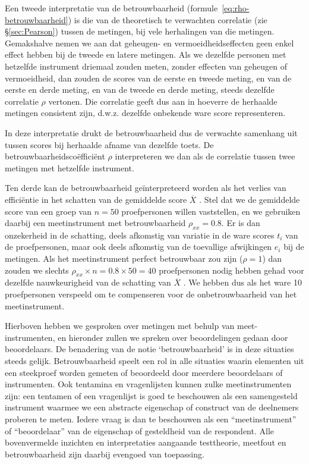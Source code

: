 \documentclass[
]{book}
\begin{document}
Een tweede interpretatie van de betrouwbaarheid (formule~\eqref{eq:rho-betrouwbaarheid})
is die van de theoretisch te verwachten correlatie (zie
§\ref{sec:Pearson}) tussen de metingen, bij vele herhalingen van
die metingen. Gemakshalve nemen we aan dat geheugen- en
vermoeidheidseffecten geen enkel effect hebben bij de tweede en latere
metingen. Als we dezelfde personen met hetzelfde instrument driemaal
zouden meten, zonder effecten van geheugen of vermoeidheid, dan zouden
de scores van de eerste en tweede meting, en van de eerste en derde
meting, en van de tweede en derde meting, steeds dezelfde correlatie
\(\rho\) vertonen. Die correlatie geeft dus aan in hoeverre de herhaalde
metingen consistent zijn, d.w.z. dezelfde onbekende ware score
representeren.

In deze interpretatie drukt de betrouwbaarheid dus de verwachte
samenhang uit tussen scores bij herhaalde afname van dezelfde toets. De
betrouwbaarheidscoëfficiënt \(\rho\) interpreteren we dan als de
correlatie tussen twee metingen met hetzelfde instrument.

Ten derde kan de betrouwbaarheid geïnterpreteerd worden als het verlies
van efficiëntie in het schatten van de gemiddelde score \(\overline{X}\)
\citep[ p.474]{Ferg89}. Stel dat we de gemiddelde score van een groep van
\(n=50\) proefpersonen willen vaststellen, en we gebruiken daarbij een
meetinstrument met betrouwbaarheid \(\rho_{xx}=0.8\). Er is dan
onzekerheid in de schatting, deels afkomstig van variatie in de ware
scores \(t_i\) van de proefpersonen, maar ook deels afkomstig van de
toevallige afwijkingen \(e_i\) bij de metingen. Als het meetinstrument
perfect betrouwbaar zou zijn (\(\rho=1\)) dan zouden we slechts
\(\rho_{xx}\times n = 0.8\times50=40\) proefpersonen nodig hebben gehad
voor dezelfde nauwkeurigheid van de schatting van \(\overline{X}\)
\citep[ p.474]{Ferg89}. We hebben dus als het ware 10 proefpersonen verspeeld
om te compenseren voor de onbetrouwbaarheid van het meetinstrument.

Hierboven hebben we gesproken over metingen met behulp van
meet-instrumenten, en hieronder zullen we spreken over beoordelingen
gedaan door beoordelaars. De benadering van de notie `betrouwbaarheid'
is in deze situaties steeds gelijk. Betrouwbaarheid speelt een rol in
alle situaties waarin elementen uit een steekproef worden gemeten of
beoordeeld door meerdere beoordelaars of instrumenten. Ook tentamina en
vragenlijsten kunnen zulke meetinstrumenten zijn: een tentamen of een
vragenlijst is goed te beschouwen als een samengesteld instrument
waarmee we een abstracte eigenschap of construct van de deelnemers
proberen te meten. Iedere vraag is dan te beschouwen als een
``meetinstrument'' of ``beoordelaar'' van de eigenschap of gesteldheid van
de respondent. Alle bovenvermelde inzichten en interpretaties aangaande
testtheorie, meetfout en betrouwbaarheid zijn daarbij evengoed van
toepassing.
\end{document}
